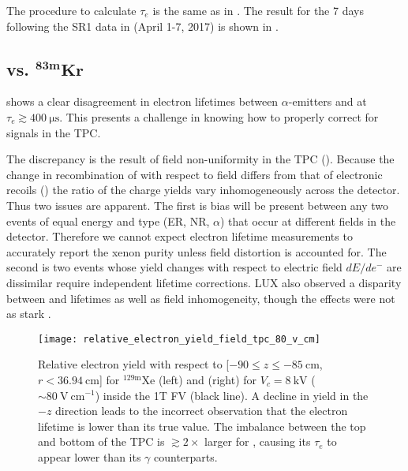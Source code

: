 The procedure to calculate $\tau_e$ is the same as in .  The result for the
7 days following the SR1 \ambe data in  (April 1-7, 2017)
is shown in .



\subsection[\ce{^{222}Rn} vs. $\mathrm{^{83m}Kr}$][\ce{^{222}Rn} vs. $\mathrm{^{83m}Kr}$]{ vs. $\mathbf{^{83m}Kr}$}
\label{subsec:electron_lifetimes_rn222_vs_kr83m}
 shows a clear disagreement in electron lifetimes between $\alpha$-emitters and \metakr
at $\tau_e \gtrsim 400\ \mathrm{\mu s}$.  This presents a challenge in knowing how to properly correct \stwob for signals in the TPC.

The discrepancy is the result of field non-uniformity in the TPC ().  Because the change in recombination
of \alphadecays with respect to field differs from that of electronic recoils () the ratio
of the charge yields vary
inhomogeneously across the detector.  Thus two issues are apparent.  The first is bias will be present between any two events of equal
energy and type (ER, NR, $\alpha$) that occur at different fields in the detector.  Therefore we cannot expect electron lifetime
measurements to accurately
report the xenon purity unless field distortion is accounted for.  The second is two events whose \electron yield changes with respect to
electric field
$dE/de^-$ are dissimilar require independent lifetime corrections.  LUX also observed a disparity between \metakr and 
lifetimes as well as field inhomogeneity, though the effects were not as stark .

\begin{figure}
\centering
\texttt{[image: relative\_electron\_yield\_field\_tpc\_80\_v\_cm]}
\caption{Relative electron yield with respect to [$-90 \leq z \leq -85\ \mathrm{cm}$, $r < 36.94\ \mathrm{cm}$] for
$\mathrm{^{129m}Xe}$ (left) and  (right) for $V_c = 8\ \mathrm{kV}$ (${\sim}80\ \mathrm{V\ cm^{-1}}$) inside the 1T FV (black
line).  A decline in yield in the $-z$ direction leads to the incorrect observation that the electron lifetime is lower than its
true value.  The imbalance between the top
and bottom of the TPC is $\gtrsim 2\times$ larger for , causing its $\tau_e$ to appear lower than its $\gamma$ counterparts.}
\label{fig:electron_lifetimes_rn222_vs_kr83m_field_tpc}
\end{figure}

